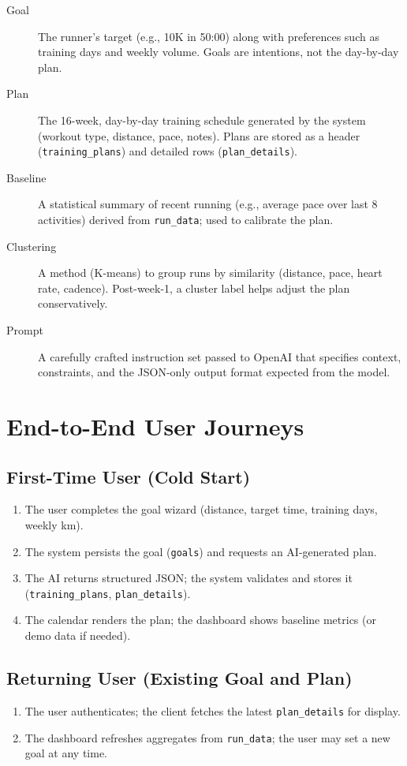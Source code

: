 \begin{description}
  \item[Goal] The runner's target (e.g., 10K in 50:00) along with preferences such as training days and weekly volume. Goals are intentions, not the day-by-day plan.
  \item[Plan] The 16-week, day-by-day training schedule generated by the system (workout type, distance, pace, notes). Plans are stored as a header (\texttt{training\_plans}) and detailed rows (\texttt{plan\_details}).
  \item[Baseline] A statistical summary of recent running (e.g., average pace over last 8 activities) derived from \texttt{run\_data}; used to calibrate the plan.
  \item[Clustering] A method (K-means) to group runs by similarity (distance, pace, heart rate, cadence). Post-week-1, a cluster label helps adjust the plan conservatively.
  \item[Prompt] A carefully crafted instruction set passed to OpenAI that specifies context, constraints, and the JSON-only output format expected from the model.
\end{description}

\section{End-to-End User Journeys}

\subsection*{First-Time User (Cold Start)}
\begin{enumerate}
  \item The user completes the goal wizard (distance, target time, training days, weekly km).
  \item The system persists the goal (\texttt{goals}) and requests an AI-generated plan.
  \item The AI returns structured JSON; the system validates and stores it (\texttt{training\_plans}, \texttt{plan\_details}).
  \item The calendar renders the plan; the dashboard shows baseline metrics (or demo data if needed).
\end{enumerate}

\subsection*{Returning User (Existing Goal and Plan)}
\begin{enumerate}
  \item The user authenticates; the client fetches the latest \texttt{plan\_details} for display.
  \item The dashboard refreshes aggregates from \texttt{run\_data}; the user may set a new goal at any time.
\end{enumerate}

